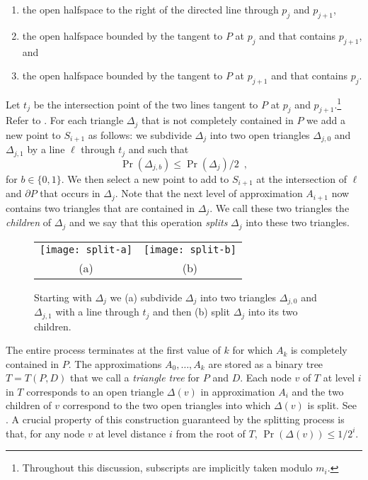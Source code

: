 \documentclass[charterfonts,lotsofwhite]{patmorin}
\newcommand{\boundary}{\partial}
\begin{document}
\begin{enumerate}
\item the open halfspace to the right of the directed line through 
	$p_j$ and $p_{j+1}$,
\item the open halfspace bounded by the tangent to $P$ at $p_j$ and that
contains $p_{j+1}$, and 
\item the open halfspace bounded by the tangent to $P$ at $p_{j+1}$ and
that contains $p_j$.
\end{enumerate}
Let $t_j$ be the intersection point of 
the two lines tangent to $P$ at $p_j$ and
$p_{j+1}$.\footnote{Throughout this discussion, subscripts are
implicitly taken modulo $m_i$.}  Refer to . For each
triangle $\Delta_j$ that is not completely contained in $P$
we add a new point to
$S_{i+1}$ as follows:  we subdivide $\Delta_j$ into two open triangles
$\Delta_{j,0}$ and $\Delta_{j,1}$ by a line $\ell$ through $t_j$ and
such that 
\[  
     \Pr(\Delta_{j,b}) \le \Pr(\Delta_{j})/2 \enspace ,
\]
for $b\in\{0,1\}$.
We then select a new point to add to $S_{i+1}$ at the intersection of
$\ell$ and $\boundary P$ that occurs in $\Delta_j$.  Note that the
next level of approximation $A_{i+1}$ now contains two triangles that
are contained in $\Delta_j$.  We call these two triangles the
\emph{children} of $\Delta_j$ and we say that this operation
\emph{splits} $\Delta_j$ into these two triangles.

\begin{figure}
\begin{center}
\begin{tabular}{cc}
\texttt{[image: split-a]} & \texttt{[image: split-b]} \\
(a) & (b)
\end{tabular}
\end{center}
\caption{Starting with $\Delta_j$ we (a) subdivide $\Delta_j$ into two triangles
$\Delta_{j,0}$ and $\Delta_{j,1}$ with a line through $t_j$ and then
(b) split $\Delta_j$ into its two children.}
\end{figure}

The entire process terminates at the first value of $k$ for which
$A_k$ is completely contained in $P$.  The approximations
$A_0,\ldots,A_k$ are stored as a binary tree $T=T(P,D)$ that we call a
\emph{triangle tree} for $P$ and $D$.  Each node $v$ of $T$ at level
$i$ in $T$ corresponds to an open triangle $\Delta(v)$ in
approximation $A_{i}$ and the two children of $v$ correspond to the
two open triangles into which $\Delta(v)$ is split. See .
A crucial property of this construction guaranteed by the splitting
process is that, for any node $v$ at level distance $i$ from the root
of $T$, $\Pr(\Delta(v))\le 1/2^i$.
\end{document}
